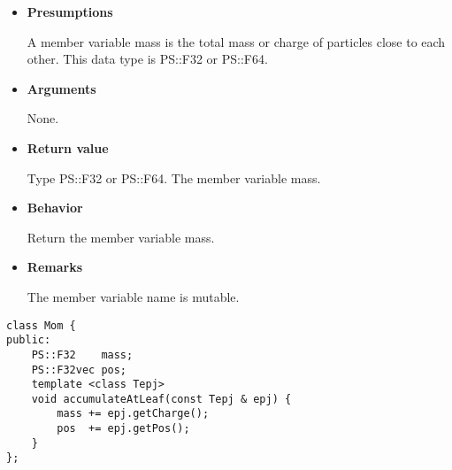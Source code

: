 \begin{itemize}

\item {\bf Presumptions}

  A member variable mass is the total mass or charge of particles
  close to each other. This data type is PS::F32 or PS::F64.

\item {\bf Arguments}

  None.
  
\item {\bf Return value}

  Type PS::F32 or PS::F64. The member variable mass.

\item {\bf Behavior}

  Return the member variable mass.
  
\item {\bf Remarks}

  The member variable name is mutable.

\end{itemize}


\begin{screen}
\begin{verbatim}
class Mom {
public:
    PS::F32    mass;
    PS::F32vec pos;
    template <class Tepj>
    void accumulateAtLeaf(const Tepj & epj) {
        mass += epj.getCharge();
        pos  += epj.getPos();
    }
};
\end{verbatim}
\end{screen}


